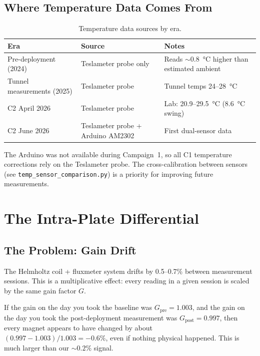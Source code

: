 \documentclass[11pt,letterpaper]{article}
\begin{document}
\subsection{Where Temperature Data Comes From}

\begin{table}[htbp]
\centering
\caption{Temperature data sources by era.}
\label{tab:tempsources}
\begin{tabular}{@{}llp{6.5cm}@{}}
\toprule
Era & Source & Notes \\
\midrule
Pre-deployment (2024) & Teslameter probe only & Reads ${\sim}$\SI{0.8}{\degreeCelsius} higher than estimated ambient \\
Tunnel measurements (2025) & Teslameter probe & Tunnel temps 24--\SI{28}{\degreeCelsius} \\
C2 April 2026 & Teslameter probe & Lab: 20.9--\SI{29.5}{\degreeCelsius} (\SI{8.6}{\degreeCelsius} swing) \\
C2 June 2026 & Teslameter probe + Arduino AM2302 & First dual-sensor data \\
\bottomrule
\end{tabular}
\end{table}

The Arduino was not available during Campaign~1, so all C1 temperature
corrections rely on the Teslameter probe. The cross-calibration between sensors
(see \texttt{temp\_sensor\_comparison.py}) is a priority for improving future
measurements.


\section{The Intra-Plate Differential}
\label{sec:differential}

\subsection{The Problem: Gain Drift}

The Helmholtz coil + fluxmeter system drifts by 0.5--0.7\% between measurement
sessions. This is a multiplicative effect: every reading in a given session is
scaled by the same gain factor $G$.

If the gain on the day you took the baseline was $G_{\mathrm{pre}} = 1.003$,
and the gain on the day you took the post-deployment measurement was
$G_{\mathrm{post}} = 0.997$, then every magnet appears to have changed by about
$(0.997 - 1.003)/1.003 = -0.6\%$, even if nothing physical happened. This is
much larger than our ${\sim}0.2\%$ signal.
\end{document}
